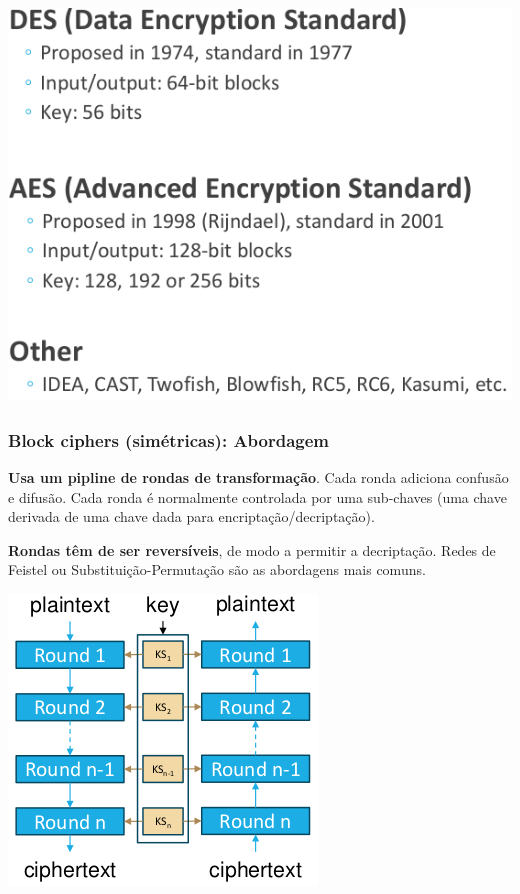 \documentclass{article}
\begin{document}
\begin{center}
  \includegraphics[scale=0.3]{75}
\end{center}

\subsubsection{Block ciphers (simétricas): Abordagem}

\begin{flushleft}
  \textbf{Usa um pipline de rondas de transformação}. Cada ronda adiciona
  confusão e difusão. Cada ronda é normalmente controlada por uma sub-chaves
  (uma chave derivada de uma chave dada para encriptação/decriptação).
  
  \vspace{2mm}

  \textbf{Rondas têm de ser reversíveis}, de modo a permitir a decriptação.
  Redes de Feistel ou Substituição-Permutação são as abordagens mais comuns.
\end{flushleft}

\begin{center}
  \includegraphics[scale=0.3]{76}
\end{center}
\end{document}
